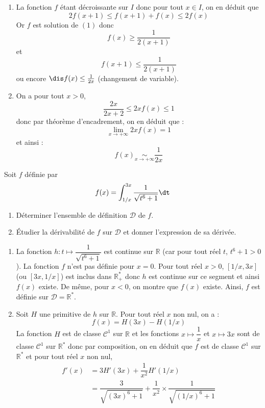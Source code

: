 \documentclass[a4paper,10pt]{report}
\begin{document}
\begin{enumerate}
	\item La fonction $f$ \'etant d\'ecroissante sur $I$ donc pour tout $x \in I$, on en d\'eduit que 
	$$2f(x+1) \le f(x+1)+f(x) \le 2f(x)$$
Or $f$ est solution de $(1)$ donc 
$$f(x)\ge \frac1{2(x+1)}$$
 et $$f(x+1) \le \frac1{2(x+1)}$$
ou encore $\dis f(x) \le \frac1{2x}$ (changement de variable).

	\item On a pour tout $x>0$,
$$\frac{2x}{2x+2} \le 2xf(x) \le 1$$ 
donc par théorème d'encadrement, on en déduit que :
$$\lim\limits_{x\to+\infty}2xf(x)=1$$
et ainsi :
$$ f(x) \underset{x\to+\infty}\sim \frac1{2x}$$
	\end{enumerate}

\begin{Exercice}{} Soit $f$ définie par 
$$f(x) = \int_{1/x}^{3x}\frac{1}{\sqrt{t^6+1}}\dt$$ 
\begin{enumerate}
\item Déterminer l'ensemble de définition $\mathcal{D}$ de $f$.
\item Étudier la dérivabilité de $f$ sur $\mathcal{D}$ et donner l'expression de sa dérivée.
\end{enumerate}
\end{Exercice} 

\corr 

\begin{enumerate}
\item La fonction $h : t \mapsto \dfrac{1}{\sqrt{t^6+1}}$ est continue sur $\mathbb{R}$ (car pour tout réel $t$, $t^6+1>0$). La fonction $f$ n'est pas définie pour $x=0$. Pour tout réel $x>0$, $[1/x,3x]$ (ou $[3x, 1/x]$) est inclus dans $\mathbb{R}_+^*$ donc $h$ est continue sur ce segment et ainsi $f(x)$ existe.  De même, pour $x<0$, on montre que $f(x)$ existe. Ainsi, $f$ est définie sur $\mathcal{D} = \mathbb{R}^*$.
\item Soit $H$ une primitive de $h$ sur $\mathbb{R}$. Pour tout réel $x$ non nul, on a :
$$ f(x) = H(3x)-H(1/x)$$
La fonction $H$ est de classe $\mathcal{C}^1$ sur $\mathbb{R}$ et les fonctions $x \mapsto \dfrac{1}{x}$ et $x \mapsto 3x$ sont de classe $\mathcal{C}^1$ sur $\mathbb{R}^*$ donc par composition, on en déduit que $f$ est de classe $\mathcal{C}^1$ sur $\mathbb{R}^*$ et pour tout réel $x$ non nul,
\begin{align*}
f'(x) & = 3 H'(3x)  + \dfrac{1}{x^2} H'(1/x) \\
& = \dfrac{3}{\sqrt{(3x)^6+1}} + \dfrac{1}{x^2} \times \dfrac{1}{\sqrt{(1/x)^6+1}} 
\end{align*}
\end{enumerate}
\end{document}
